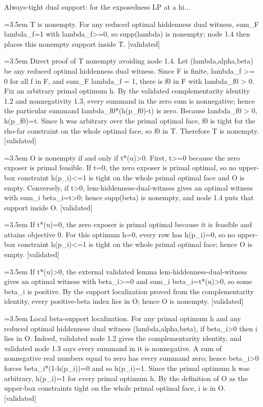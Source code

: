 \documentclass{article}
\newcommand{\step}[1]{\par\noindent\hangindent=3.5em\hangafter=1%
  \makebox[3.5em][l]{\textbf{#1.}}}
\newcommand{\steptag}[1]{\hfill{\small\textsf{[#1]}}}
\begin{document}
\begin{proofbox}{Always-tight dual support: for the exposedness LP at a hi...}
\step{1.5} T is nonempty. For any reduced optimal hiddenness dual witness, sum\_F lambda\_f=1 with lambda\_f>=0, so supp(lambda) is nonempty; node 1.4 then places this nonempty support inside T. \steptag{validated} \\[6pt]
\step{1.5.1} Direct proof of T nonempty avoiding node 1.4. Let (lambda,alpha,beta) be any reduced optimal hiddenness dual witness. Since F is finite, lambda\_f >= 0 for all f in F, and sum\_F lambda\_f = 1, there is f0 in F with lambda\_f0 > 0. Fix an arbitrary primal optimum h. By the validated complementarity identity 1.2 and nonnegativity 1.3, every summand in the zero sum is nonnegative; hence the particular summand lambda\_f0*(h(p\_f0)-t) is zero. Because lambda\_f0 > 0, h(p\_f0)=t. Since h was arbitrary over the primal optimal face, f0 is tight for the rho-far constraint on the whole optimal face, so f0 in T. Therefore T is nonempty. \steptag{validated} \\[4pt]
\step{1.6} O is nonempty if and only if t*(u)>0. First, t>=0 because the zero exposer is primal feasible. If t=0, the zero exposer is primal optimal, so no upper-box constraint h(p\_i)<=1 is tight on the whole primal optimal face and O is empty. Conversely, if t>0, lem-hiddenness-dual-witness gives an optimal witness with sum\_i beta\_i=t>0; hence supp(beta) is nonempty, and node 1.4 puts that support inside O. \steptag{validated} \\[6pt]
\step{1.6.1} If t*(u)=0, the zero exposer is primal optimal because it is feasible and attains objective 0. For this optimum h=0, every row has h(p\_i)=0, so no upper-box constraint h(p\_i)<=1 is tight on the whole primal optimal face; hence O is empty. \steptag{validated} \\[4pt]
\step{1.6.2} If t*(u)>0, the external validated lemma lem-hiddenness-dual-witness gives an optimal witness with beta\_i>=0 and sum\_i beta\_i=t*(u)>0, so some beta\_i is positive. By the support localization proved from the complementarity identity, every positive-beta index lies in O; hence O is nonempty. \steptag{validated} \\[6pt]
\step{1.6.2.1} Local beta-support localization. For any primal optimum h and any reduced optimal hiddenness dual witness (lambda,alpha,beta), if beta\_i>0 then i lies in O. Indeed, validated node 1.2 gives the complementarity identity, and validated node 1.3 says every summand in it is nonnegative. A sum of nonnegative real numbers equal to zero has every summand zero; hence beta\_i>0 forces beta\_i*(1-h(p\_i))=0 and so h(p\_i)=1. Since the primal optimum h was arbitrary, h(p\_i)=1 for every primal optimum h. By the definition of O as the upper-box constraints tight on the whole primal optimal face, i is in O. \steptag{validated} \\[4pt]

\end{proofbox}
\end{document}
